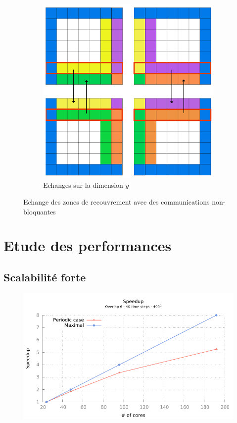 \documentclass{beamer}
\begin{document}
\begin{frame}
\begin{figure}[!ht]
\begin{subfigure}[b]{0.5\textwidth}
    \includegraphics[scale=0.12]{figures/comm2.png}
    \caption{\label{fig:comm2}Echanges sur la dimension $y$}
  \end{subfigure}
  \caption{\label{fig:comm_synch}Echange des zones de recouvrement avec des communications non-bloquantes}
\end{figure}
\end{frame}


%
%

\section{Etude des performances}
\subsection{Scalabilité forte}
\begin{frame}
  \begin{figure}[ht]
    \centering
    \includegraphics[page=2,scale=0.8]{gnuplot/bench_strong_nemo.pdf}
    \caption{\label{fig:label} }
  \end{figure}

\end{frame}
\end{document}
